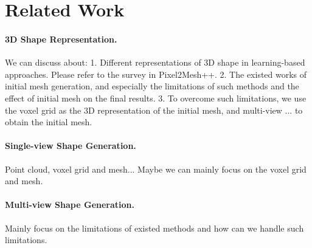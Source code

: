 \section{Related Work}

\textcolor{myRed}{
\paragraph{3D Shape Representation.} 
We can discuss about:
1. Different representations of 3D shape in learning-based approaches. Please refer to the survey in Pixel2Mesh++.
2. The existed works of initial mesh generation, and especially the limitations of such methods and the effect of initial mesh on the final results.
3. To overcome such limitations, we use the voxel grid as the 3D representation of the initial mesh, and multi-view ... to obtain the initial mesh.
\paragraph{Single-view Shape Generation.} 
Point cloud, voxel grid and mesh... Maybe we can mainly focus on the voxel grid and mesh.
\paragraph{Multi-view Shape Generation.}
Mainly focus on the limitations of existed methods and how can we handle such limitations.
}

